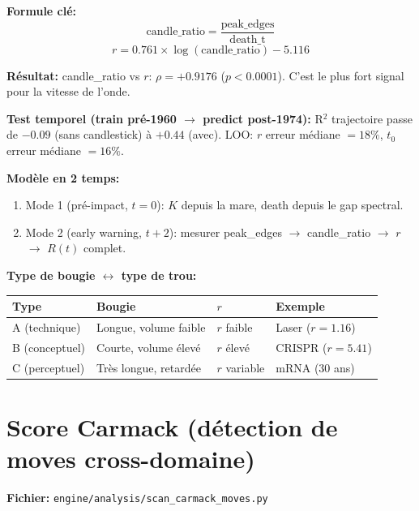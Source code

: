 \documentclass[11pt,a4paper]{article}
\begin{document}
\textbf{Formule cl\'e:}
\begin{equation}
\boxed{\text{candle\_ratio} = \frac{\text{peak\_edges}}{\text{death\_t}}}
\end{equation}
\begin{equation}
r = 0.761 \times \log(\text{candle\_ratio}) - 5.116
\end{equation}

\textbf{R\'esultat:} candle\_ratio vs $r$: $\rho = +0.9176$ ($p < 0.0001$).
C'est le plus fort signal pour la vitesse de l'onde.

\textbf{Test temporel (train pr\'e-1960 $\to$ predict post-1974):}
R$^2$ trajectoire passe de $-0.09$ (sans candlestick) \`a $+0.44$ (avec).
LOO: $r$ erreur m\'ediane $= 18\%$, $t_0$ erreur m\'ediane $= 16\%$.

\textbf{Mod\`ele en 2 temps:}
\begin{enumerate}
\item Mode 1 (pr\'e-impact, $t=0$): $K$ depuis la mare, death depuis le gap spectral.
\item Mode 2 (early warning, $t+2$): mesurer peak\_edges $\to$
  candle\_ratio $\to$ $r$ $\to$ $R(t)$ complet.
\end{enumerate}

\textbf{Type de bougie $\leftrightarrow$ type de trou:}
\begin{center}
\begin{tabular}{llll}
\toprule
\textbf{Type} & \textbf{Bougie} & \textbf{$r$} & \textbf{Exemple} \\
\midrule
A (technique) & Longue, volume faible & $r$ faible & Laser ($r = 1.16$) \\
B (conceptuel) & Courte, volume \'elev\'e & $r$ \'elev\'e & CRISPR ($r = 5.41$) \\
C (perceptuel) & Tr\`es longue, retard\'ee & $r$ variable & mRNA (30 ans) \\
\bottomrule
\end{tabular}
\end{center}

\section{Score Carmack (d\'etection de moves cross-domaine)}

\textbf{Fichier:} \texttt{engine/analysis/scan\_carmack\_moves.py}
\end{document}
